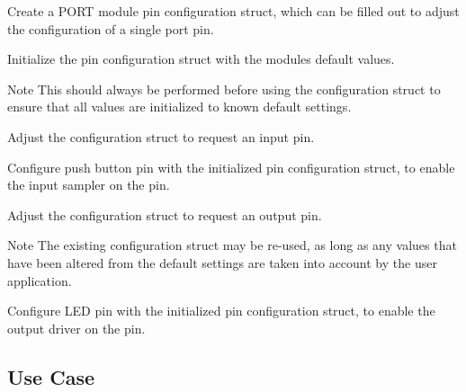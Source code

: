 \begin{DoxyEnumerate}
\item Create a P\+O\+RT module pin configuration struct, which can be filled out to adjust the configuration of a single port pin. 
\begin{DoxyCodeInclude}{0}
\end{DoxyCodeInclude}

\item Initialize the pin configuration struct with the module\textquotesingle{}s default values. 
\begin{DoxyCodeInclude}{0}
\end{DoxyCodeInclude}
 \begin{DoxyNote}{Note}
This should always be performed before using the configuration struct to ensure that all values are initialized to known default settings.
\end{DoxyNote}

\item Adjust the configuration struct to request an input pin. 
\begin{DoxyCodeInclude}{0}
\end{DoxyCodeInclude}

\item Configure push button pin with the initialized pin configuration struct, to enable the input sampler on the pin. 
\begin{DoxyCodeInclude}{0}
\end{DoxyCodeInclude}

\item Adjust the configuration struct to request an output pin. 
\begin{DoxyCodeInclude}{0}
\end{DoxyCodeInclude}
 \begin{DoxyNote}{Note}
The existing configuration struct may be re-\/used, as long as any values that have been altered from the default settings are taken into account by the user application.
\end{DoxyNote}

\item Configure L\+ED pin with the initialized pin configuration struct, to enable the output driver on the pin. 
\begin{DoxyCodeInclude}{0}
\end{DoxyCodeInclude}
 
\end{DoxyEnumerate}\hypertarget{asfdoc_sam0_port_basic_use_case_asfdoc_sam0_port_basic_use_case_use_main}{}\subsection{Use Case}\label{asfdoc_sam0_port_basic_use_case_asfdoc_sam0_port_basic_use_case_use_main}
